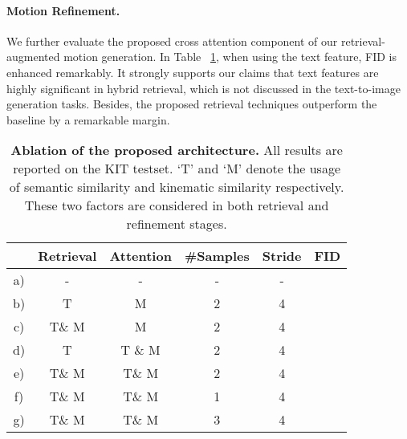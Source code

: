 \documentclass[10pt,twocolumn,letterpaper]{article}
\begin{document}
\paragraph{Motion Refinement.} We further evaluate the proposed cross attention component of our retrieval-augmented motion generation. In Table ~\ref{tab:cross_attention}, when using the text feature, FID is enhanced remarkably. It strongly supports our claims that text features are highly significant in hybrid retrieval, which is not discussed in the text-to-image generation tasks. Besides, the proposed retrieval techniques outperform the baseline by a remarkable margin.

\begin{table}[t]
\centering
\small
\caption{\textbf{Ablation of the proposed architecture.} All results are reported on the KIT testset. `T' and `M' denote the usage of semantic similarity and kinematic similarity respectively. These two factors are considered in both retrieval and refinement stages.}
\label{tab:cross_attention}
\setlength{\tabcolsep}{1.4mm}
{
\begin{tabular}{cccccc}
\hline

& Retrieval & Attention & \#Samples & Stride & FID \\
\hline
a) & - & - & - & - &  \\
\hline
b) & T & M & 2 & 4 &  \\
c) & T\& M & M & 2 & 4 &  \\
d) & T & T \& M & 2 & 4 &  \\
e) & T\& M & T\& M & 2 & 4 &  \\
\hline
f) & T\& M & T\& M & 1 & 4 &  \\
g) & T\& M & T\& M & 3 & 4 &  \\
\hline
\end{tabular}}
\vspace{-10pt}
\end{table}
\end{document}
